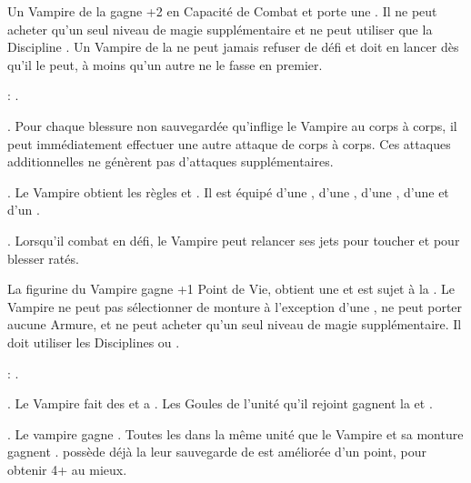 {\medskip

\separator


\noindent\parbox{\columnwidth}{
Un Vampire de la \brotherhood{} gagne +2 en Capacité de Combat et porte une \platearmour{}. Il ne peut acheter qu'un seul niveau de magie supplémentaire et ne peut utiliser que la Discipline \necromancy{}. Un Vampire de la \brotherhood{} ne peut jamais refuser de défi et doit en lancer dès qu'il le peut, à moins qu'un autre  ne le fasse en premier.

\bloodties{}: \vampireknights{}.
}

\startpricelist

 \textbf{\ancientbloodpower}. Pour chaque blessure non sauvegardée qu'inflige le Vampire au corps à corps, il peut immédiatement effectuer une autre attaque de corps à corps. Ces attaques additionnelles ne génèrent pas d'attaques supplémentaires.

 \textbf{\bloodlinepower}. Le Vampire obtient les règles \weaponmaster{} et . Il est équipé d'une \ahw{}, d'une \halberd{}, d'une \gw{}, d'une \lance{} et d'un \shield{}.

 \textbf{\bloodlinepower}. Lorsqu'il combat en défi, le Vampire peut relancer ses jets pour toucher et pour blesser ratés.

\endpricelist


\noindent\parbox{\columnwidth}{
La figurine du Vampire \strigoi{} gagne +1 Point de Vie, obtient une  et est sujet à la \hatred{}. Le Vampire ne peut pas sélectionner de monture à l'exception d'une \shriekinghorror{}, ne peut porter aucune Armure, et ne peut acheter qu'un seul niveau de magie supplémentaire. Il doit utiliser les Disciplines \wilderness{} ou \necromancy{}.

\bloodties{}: \ghouls{}.
}

\startpricelist

 \textbf{\ancientbloodpower}. Le Vampire fait des \poisonedattacks{} et a . Les Goules de l'unité qu'il rejoint gagnent la \hatred{} et .

 \textbf{\bloodlinepower}. Le vampire gagne . Toutes les \ghouls{} dans la même unité que le Vampire et sa monture gagnent .  possède déjà la \regeneration{} leur sauvegarde de \regeneration{} est améliorée d'un point, pour obtenir 4+ au mieux.

}
